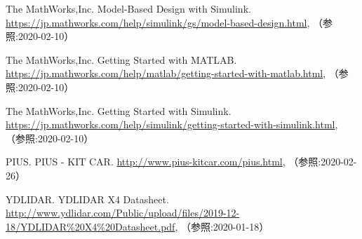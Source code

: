{\begin{thebibliography}{9}
   The MathWorks,Inc. Model-Based Design with Simulink. \url{https://jp.mathworks.com/help/simulink/gs/model-based-design.html}, （参照:2020-02-10）

   The MathWorks,Inc. Getting Started with MATLAB. \url{https://jp.mathworks.com/help/matlab/getting-started-with-matlab.html}, （参照:2020-02-10）

   The MathWorks,Inc. Getting Started with Simulink. \url{https://jp.mathworks.com/help/simulink/getting-started-with-simulink.html}, （参照:2020-02-10）

   PIUS. PIUS - KIT CAR. \url{http://www.pius-kitcar.com/pius.html}, （参照:2020-02-26）

   YDLIDAR. YDLIDAR X4 Datasheet. \url{http://www.ydlidar.com/Public/upload/files/2019-12-18/YDLIDAR%20X4%20Datasheet.pdf}, （参照:2020-01-18）

\end{thebibliography}
}